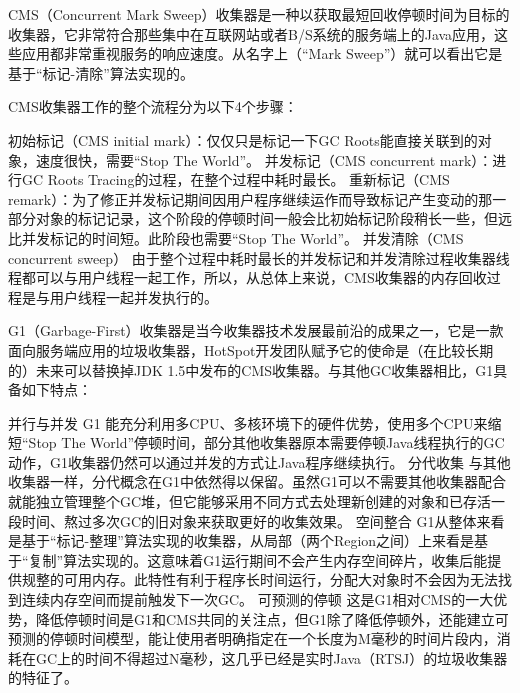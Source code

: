 \documentclass[../../../interview-questions.tex]{subfiles}
\begin{document}
CMS（Concurrent Mark Sweep）收集器是一种以获取最短回收停顿时间为目标的收集器，它非常符合那些集中在互联网站或者B/S系统的服务端上的Java应用，这些应用都非常重视服务的响应速度。从名字上（“Mark Sweep”）就可以看出它是基于“标记-清除”算法实现的。

CMS收集器工作的整个流程分为以下4个步骤：

初始标记（CMS initial mark）：仅仅只是标记一下GC Roots能直接关联到的对象，速度很快，需要“Stop The World”。
并发标记（CMS concurrent mark）：进行GC Roots Tracing的过程，在整个过程中耗时最长。
重新标记（CMS remark）：为了修正并发标记期间因用户程序继续运作而导致标记产生变动的那一部分对象的标记记录，这个阶段的停顿时间一般会比初始标记阶段稍长一些，但远比并发标记的时间短。此阶段也需要“Stop The World”。
并发清除（CMS concurrent sweep）
由于整个过程中耗时最长的并发标记和并发清除过程收集器线程都可以与用户线程一起工作，所以，从总体上来说，CMS收集器的内存回收过程是与用户线程一起并发执行的。


G1（Garbage-First）收集器是当今收集器技术发展最前沿的成果之一，它是一款面向服务端应用的垃圾收集器，HotSpot开发团队赋予它的使命是（在比较长期的）未来可以替换掉JDK 1.5中发布的CMS收集器。与其他GC收集器相比，G1具备如下特点：

并行与并发 G1 能充分利用多CPU、多核环境下的硬件优势，使用多个CPU来缩短“Stop The World”停顿时间，部分其他收集器原本需要停顿Java线程执行的GC动作，G1收集器仍然可以通过并发的方式让Java程序继续执行。
分代收集 与其他收集器一样，分代概念在G1中依然得以保留。虽然G1可以不需要其他收集器配合就能独立管理整个GC堆，但它能够采用不同方式去处理新创建的对象和已存活一段时间、熬过多次GC的旧对象来获取更好的收集效果。
空间整合 G1从整体来看是基于“标记-整理”算法实现的收集器，从局部（两个Region之间）上来看是基于“复制”算法实现的。这意味着G1运行期间不会产生内存空间碎片，收集后能提供规整的可用内存。此特性有利于程序长时间运行，分配大对象时不会因为无法找到连续内存空间而提前触发下一次GC。
可预测的停顿 这是G1相对CMS的一大优势，降低停顿时间是G1和CMS共同的关注点，但G1除了降低停顿外，还能建立可预测的停顿时间模型，能让使用者明确指定在一个长度为M毫秒的时间片段内，消耗在GC上的时间不得超过N毫秒，这几乎已经是实时Java（RTSJ）的垃圾收集器的特征了。
\end{document}
